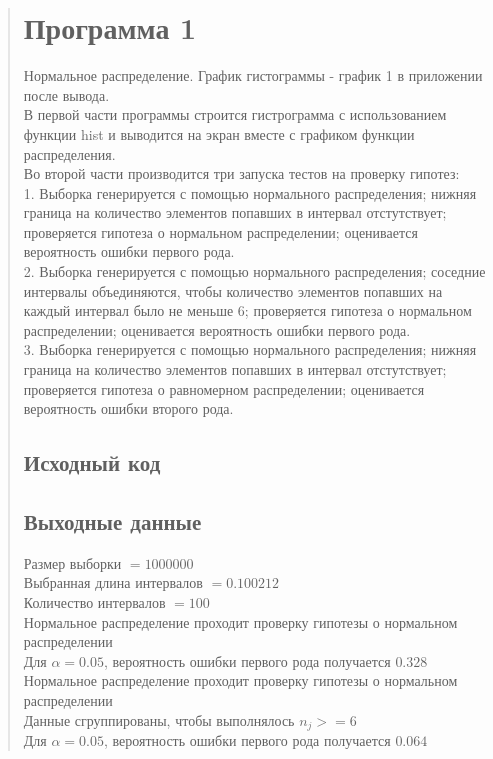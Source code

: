 \documentclass{article}
\begin{document}
\begin{quote}
\section{Программа 1}
	Нормальное распределение. График гистограммы - график 1 в приложении после вывода. \\
	В первой части программы строится гистрограмма с использованием функции hist и выводится на экран вместе с графиком функции распределения. \\
	Во второй части производится три запуска тестов на проверку гипотез: \\
	1. Выборка генерируется с помощью нормального распределения; нижняя граница на количество элементов попавших в интервал отстутствует; проверяется гипотеза о нормальном распределении; оценивается вероятность ошибки первого рода. \\
	2. Выборка генерируется с помощью нормального распределения; соседние интервалы объединяются, чтобы количество элементов попавших на каждый интервал было не меньше 6; проверяется гипотеза о нормальном распределении; оценивается вероятность ошибки первого рода. \\
	3. Выборка генерируется с помощью нормального распределения; нижняя граница на количество элементов попавших в интервал отстутствует; проверяется гипотеза о равномерном распределении; оценивается вероятность ошибки второго рода. \\
\subsection{Исходный код}
	
\subsection{Выходные данные}
	Размер выборки $= 1000000$ \\
	Выбранная длина интервалов $= 0.100212$ \\
	Количество интервалов $= 100$ \\

	Нормальное распределение проходит проверку гипотезы о нормальном распределении \\
	Для $\alpha = 0.05$, вероятность ошибки первого рода получается $0.328$ \\

	Нормальное распределение проходит проверку гипотезы о нормальном распределении \\
	Данные сгруппированы, чтобы выполнялось $n_j >= 6$ \\
	Для $\alpha = 0.05$, вероятность ошибки первого рода получается $0.064$ \\


\end{quote}
\end{document}
